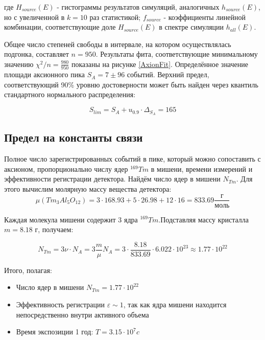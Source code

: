 \documentclass[a4paper,article,14pt]{extarticle}
\begin{document}
где $H_{source}\left( E \right)$ - гистограммы результатов симуляций, аналогичных $h_{source}\left( E \right)$, но с увеличенной в $k=10$ раз статистикой; $f_{source}$ - коэффициенты линейной комбинации, соответствующие доле $H_{source}\left( E \right)$ в спектре симуляции $h_{all} \left( E \right)$.

Общее число степеней свободы в интервале, на котором осуществлялась подгонка, составляет $n = 950$. Результаты фита, соответствующие минимальному значению $\chi^2 /n = \frac{980}{950}$ показаны на рисунке \ref{AxionFit}. Определённое значение площади аксионного пика $S_A = 7 \pm 96 $ событий. Верхний предел, соответствующий 90\% уровню достоверности может быть найден через квантиль стандартного нормального распределения:

\begin{equation}
    S_{lim} = S_A + u_{0.9} \cdot \Delta_{S_A} = 165
\end{equation}

\subsection{Предел на константы связи}
Полное число зарегистрированных событий в пике, который можно сопоставить с аксионом, пропорционально числу ядер $^{169}Tm$ в мишени, времени измерений и эффективности регистрации детектора. Найдём число ядер в мишени ${N_{Tm}}$. Для этого вычислим молярную массу вещества детектора:
\begin{equation}
    \mu \left( {T{m_3}A{l_5}{O_{12}}} \right) = 3 \cdot 168.93 + 5 \cdot 26.98 + 12 \cdot 16 = 833.69\frac{\text{г}}{{\text{моль}}}
\end{equation}

Каждая молекула мишени содержит 3 ядра $^{169}Tm$.Подставляя массу кристалла $m= 8.18 \text{ г}$, получаем:

\begin{equation}
   {N_{Tm}} = 3\nu  \cdot {N_A} = 3\frac{m}{\mu }{N_A} = 3 \cdot \frac{{8.18}}{{833.69}} \cdot 6.022 \cdot {10^{23}} \approx 1.77 \cdot {10^{22}}
\end{equation}

Итого, полагая:
\begin{itemize}
    \item Число ядер в мишени $N_{Tm} = 1.77 \cdot {10^{22}}$
    \item Эффективность регистрации $\varepsilon \sim 1 $, так как ядра мишени находится непосредственно внутри активного объема
    \item Время экспозиции 1 год: $T = 3.15 \cdot {10^7} c$
\end{itemize}
\end{document}
